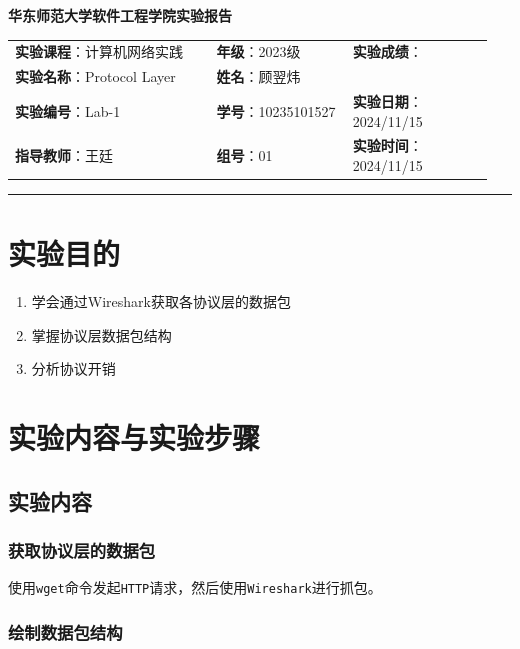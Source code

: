 \documentclass{article}
\begin{document}
	\begin{center}
		{\Large{\textbf{\heiti 华东师范大学软件工程学院实验报告}}}
		\begin{table}[htb]
			\flushleft
			\begin{tabular}{p{0.4\linewidth}p{0.27\linewidth}p{0.28\linewidth}}\\
				\textbf{实验课程}：计算机网络实践  & \textbf{年级}：2023级       & \textbf{实验成绩}：  \\
				\textbf{实验名称}：Protocol Layer & \textbf{姓名}：顾翌炜         &                 \\
				\textbf{实验编号}：Lab-1     & \textbf{学号}：10235101527 & \textbf{实验日期}：2024/11/15  \\
				\textbf{指导教师}：王廷     & \textbf{组号}：01            & \textbf{实验时间}：2024/11/15  \\ 
			\end{tabular}
		\end{table}
	\end{center}
	\rule{\textwidth}{2pt}
	
	\section{实验目的}
	
	\begin{enumerate}[noitemsep, label={{\arabic*})}]
		\item 学会通过Wireshark获取各协议层的数据包
		\item 掌握协议层数据包结构
		\item 分析协议开销
	\end{enumerate}
	
	\section{实验内容与实验步骤}
	
	\subsection{实验内容}
	
	\subsubsection{获取协议层的数据包}
	使用\texttt{wget}命令发起\texttt{HTTP}请求，然后使用\texttt{Wireshark}进行抓包。
	
	\subsubsection{绘制数据包结构}
	
\end{document}
